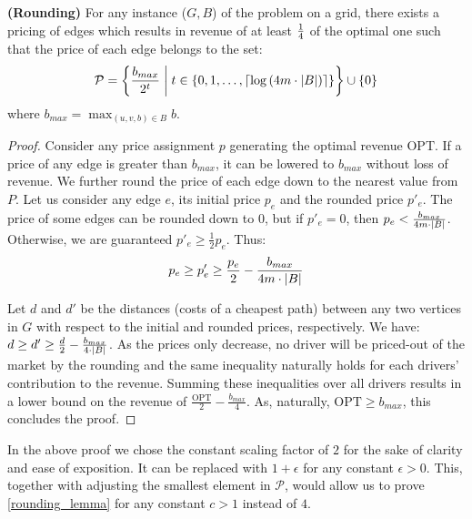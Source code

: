 \newcommand{\roundedSet}{\mathcal{P}}

\begin{lemma}{\textbf{(Rounding)}}
    \label{rounding_lemma}
For any instance ($G, B$) of the problem on a grid,
there exists a pricing of edges which results in revenue of at least $\frac{1}{4}$ of the optimal one such that the price of each edge belongs to the set:
$$ \roundedSet = \longset{\frac{b_{max}}{2^t}}{t \in \set{0, 1, \dots, \ceil{\log \bra{ 4 m \cdot \abs{B} }}}} \cup \set{0} $$
where $b_{max} = \max_{(u, v, b) \in B} b$.
\end{lemma}
\begin{proof}
	Consider any price assignment $p$ generating the optimal revenue $\mathrm{OPT}$.
	If a price of any edge is greater than $b_{max}$, it can be lowered to $b_{max}$ without loss of revenue.
	We further round the price of each edge down to the nearest value from $P$.
    Let us consider any edge $e$, its initial price $p_e$ and the rounded price $p'_e$.
    The price of some edges can be rounded down to $0$, but if $p'_e = 0$, then $p_e < \frac{b_{max}}{4 m \cdot \left| B \right|}$.
    Otherwise, we are guaranteed $p'_e \geq \frac{1}{2} p_e$.
    Thus: \[p_e \geq p'_e \geq \frac{p_e}{2} - \frac{b_{max}}{4 m \cdot \left| B \right|}\]

    Let $d$ and $d'$ be the distances (costs of a cheapest path) between any two vertices in $G$ with respect to the initial and rounded prices, respectively. 
    We have: $d \geq d' \geq \frac{d}{2} - \frac{b_{max}}{4 \cdot \left| B \right|}$.
    As the prices only decrease, no driver will be priced-out of the market by the rounding and the same inequality naturally holds for each drivers' contribution to the revenue.
	Summing these inequalities over all drivers results in a lower bound on the revenue of $\frac{\mathrm{OPT}}{2} - \frac{b_{max}}{4}$.
	As, naturally, $\mathrm{OPT} \geq b_{max}$, this concludes the proof.
\end{proof}

In the above proof we chose the constant scaling factor of $2$ for the sake of clarity and ease of exposition.
It can be replaced with $1 + \epsilon$ for any constant $\epsilon > 0$.
This, together with adjusting the smallest element in $\roundedSet$, would allow us to prove \cref{rounding_lemma} for any constant $c > 1$ instead of $4$.
